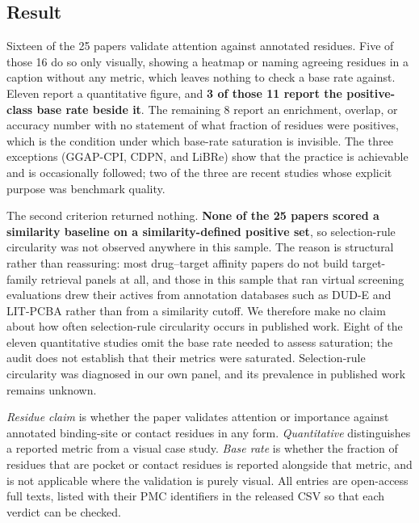 \documentclass[11pt]{article}
\newenvironment{smalltable}%
{\begin{table}[!htbp]\centering\begingroup\setlength{\tabcolsep}{3pt}\renewcommand{\arraystretch}{1.1}\footnotesize}%
{\endgroup\end{table}}
\begin{document}
\subsection{Result}
Sixteen of the 25 papers validate attention against annotated residues. Five of those 16 do so only visually, showing a heatmap or naming agreeing residues in a caption without any metric, which leaves nothing to check a base rate against. Eleven report a quantitative figure, and \textbf{3 of those 11 report the positive-class base rate beside it}. The remaining 8 report an enrichment, overlap, or accuracy number with no statement of what fraction of residues were positives, which is the condition under which base-rate saturation is invisible. The three exceptions (GGAP-CPI, CDPN, and LiBRe) show that the practice is achievable and is occasionally followed; two of the three are recent studies whose explicit purpose was benchmark quality.

The second criterion returned nothing. \textbf{None of the 25 papers scored a similarity baseline on a similarity-defined positive set}, so selection-rule circularity was not observed anywhere in this sample. The reason is structural rather than reassuring: most drug--target affinity papers do not build target-family retrieval panels at all, and those in this sample that ran virtual screening evaluations drew their actives from annotation databases such as DUD-E and LIT-PCBA rather than from a similarity cutoff. We therefore make no claim about how often selection-rule circularity occurs in published work. Eight of the eleven quantitative studies omit the base rate needed to assess saturation; the audit does not establish that their metrics were saturated. Selection-rule circularity was diagnosed in our own panel, and its prevalence in published work remains unknown.

\begin{smalltable}
\caption{\textbf{Audit of 25 published drug--target affinity and compound--protein interaction studies.}}
\label{tab:literature_audit}
\par\vspace{3pt}
\begin{minipage}{\linewidth}\footnotesize\raggedright
\textit{Residue claim} is whether the paper validates attention or importance against annotated binding-site or contact residues in any form. \textit{Quantitative} distinguishes a reported metric from a visual case study. \textit{Base rate} is whether the fraction of residues that are pocket or contact residues is reported alongside that metric, and is not applicable where the validation is purely visual. All entries are open-access full texts, listed with their PMC identifiers in the released CSV so that each verdict can be checked.
\end{minipage}
\end{smalltable}
\end{document}
